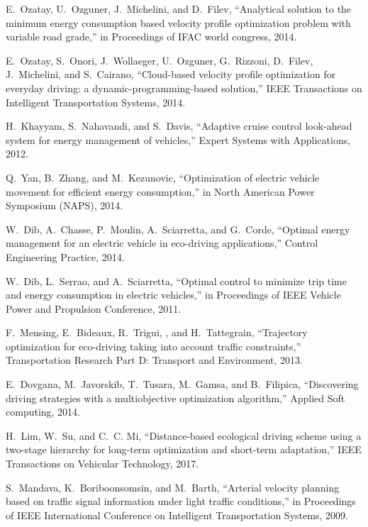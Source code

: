 E.~Ozatay, U.~Ozguner, J.~Michelini, and D.~Filev, ``Analytical solution to the
  minimum energy consumption based velocity profile optimization problem with
  variable road grade,'' in Proceedings of IFAC world congress, 2014.

E.~Ozatay, S.~Onori, J.~Wollaeger, U.~Ozguner, G.~Rizzoni, D.~Filev,
  J.~Michelini, and S.~Cairano, ``Cloud-based velocity profile optimization for
  everyday driving: a dynamic-programming-based solution,'' IEEE
  Transactions on Intelligent Transportation Systems, 2014.

H.~Khayyam, S.~Nahavandi, and S.~Davis, ``Adaptive cruise control look-ahead
  system for energy management of vehicles,'' Expert Systems with
  Applications, 2012.

Q.~Yan, B.~Zhang, and M.~Kezunovic, ``Optimization of electric vehicle movement
  for efficient energy consumption,'' in North American Power Symposium
  (NAPS), 2014.

W.~Dib, A.~Chasse, P.~Moulin, A.~Sciarretta, and G.~Corde, ``Optimal energy
  management for an electric vehicle in eco-driving applications,'' 
  Control Engineering Practice, 2014.

W.~Dib, L.~Serrao, and A.~Sciarretta, ``Optimal control to minimize trip time
  and energy consumption in electric vehicles,'' in Proceedings of IEEE
  Vehicle Power and Propulsion Conference, 2011.

F.~Mensing, E.~Bideaux, R.~Trigui, , and H.~Tattegrain, ``Trajectory
  optimization for eco-driving taking into account traffic constraints,'' 
  Transportation Research Part D: Transport and Environment, 2013.

E.~Dovgana, M.~Javorskib, T.~Tusara, M.~Gamsa, and B.~Filipica, ``Discovering
  driving strategies with a multiobjective optimization algorithm,'' 
  Applied Soft computing, 2014.

H.~Lim, W.~Su, and C.~C. Mi, ``Distance-based ecological driving scheme using a
  two-stage hierarchy for long-term optimization and short-term adaptation,''
  IEEE Transactions on Vehicular Technology, 2017.

S.~Mandava, K.~Boriboonsomsin, and M.~Barth, ``Arterial velocity planning based
  on traffic signal information under light traffic conditions,'' in 
  Proceedings of IEEE International Conference on Intelligent Transportation
  Systems, 2009.

